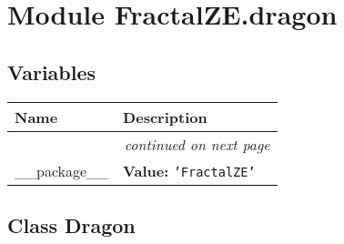 %
%
%


\section{Module FractalZE.dragon}

    \label{FractalZE:dragon}


  \subsection{Variables}

    \vspace{-1cm}
\hspace{\varindent}\begin{longtable}{|p{\varnamewidth}|p{\vardescrwidth}|l}
\cline{1-2}
\cline{1-2} \centering \textbf{Name} & \centering \textbf{Description}& \\
\cline{1-2}
\endhead\cline{1-2}\multicolumn{3}{r}{\small\textit{continued on next page}}\\\endfoot\cline{1-2}
\endlastfoot\raggedright \_\-\_\-p\-a\-c\-k\-a\-g\-e\-\_\-\_\- & \raggedright \textbf{Value:} 
{\tt \texttt{'}\texttt{FractalZE}\texttt{'}}&\\
\cline{1-2}
\end{longtable}



\subsection{Class Dragon}

